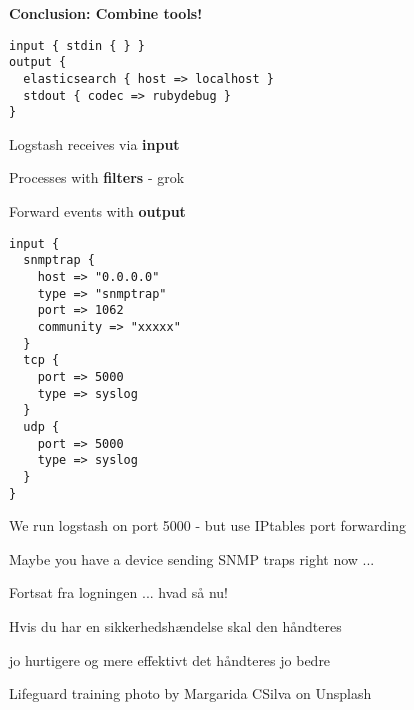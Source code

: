 \documentclass[Screen16to9,17pt]{foils}
\begin{document}
\vskip 2cm
\centerline{\bf\Large Conclusion: Combine tools!}



\begin{verbatim}
input { stdin { } }
output {
  elasticsearch { host => localhost }
  stdout { codec => rubydebug }
}
\end{verbatim}



\begin{list2}
\item Logstash receives via {\bf input}
\item Processes with {\bf filters} - grok
\item Forward events with {\bf output}
\end{list2}



{\footnotesize
\begin{verbatim}
input {
  snmptrap {
    host => "0.0.0.0"
    type => "snmptrap"
    port => 1062
    community => "xxxxx"
  }
  tcp {
    port => 5000
    type => syslog
  }
  udp {
    port => 5000
    type => syslog
  }
}
\end{verbatim}
}

\begin{list2}
\item We run logstash on port 5000 - but use IPtables port forwarding
\end{list2}

Maybe you have a device sending SNMP traps right now ...



\begin{list2}
\item Fortsat fra logningen ... hvad så nu!
\item Hvis du har en sikkerhedshændelse skal den håndteres
\item jo hurtigere og mere effektivt det håndteres jo bedre
\end{list2}

Lifeguard training photo by Margarida CSilva on Unsplash
\end{document}
